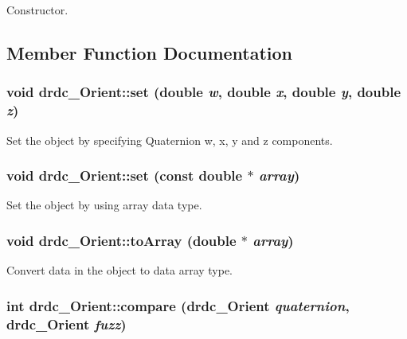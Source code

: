 Constructor. 



\subsection{Member Function Documentation}
\hypertarget{classdrdc__Orient_642bb1378fd6c41a0aebfee8e810d0b6}{
\subsubsection[set]{\setlength{\rightskip}{0pt plus 5cm}void drdc\_\-Orient::set (double {\em w}, \/  double {\em x}, \/  double {\em y}, \/  double {\em z})}}
\label{classdrdc__Orient_642bb1378fd6c41a0aebfee8e810d0b6}


Set the object by specifying Quaternion w, x, y and z components. 

\hypertarget{classdrdc__Orient_0c6237458b433366d8b4dbebd3aae07f}{
\subsubsection[set]{\setlength{\rightskip}{0pt plus 5cm}void drdc\_\-Orient::set (const double $\ast$ {\em array})}}
\label{classdrdc__Orient_0c6237458b433366d8b4dbebd3aae07f}


Set the object by using array data type. 

\hypertarget{classdrdc__Orient_e1370cfb23679b196d42b365f1320031}{
\subsubsection[toArray]{\setlength{\rightskip}{0pt plus 5cm}void drdc\_\-Orient::toArray (double $\ast$ {\em array})}}
\label{classdrdc__Orient_e1370cfb23679b196d42b365f1320031}


Convert data in the object to data array type. 

\hypertarget{classdrdc__Orient_983ee9cf2e5b2c531e81505317021751}{
\subsubsection[compare]{\setlength{\rightskip}{0pt plus 5cm}int drdc\_\-Orient::compare ({\bf drdc\_\-Orient} {\em quaternion}, \/  {\bf drdc\_\-Orient} {\em fuzz})}}
\label{classdrdc__Orient_983ee9cf2e5b2c531e81505317021751}


